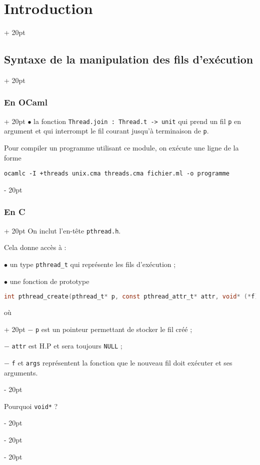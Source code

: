 \documentclass[a4paper, 12pt, twoside]{article}
\newcommand{\ind}[1][20pt]{\advance\leftskip + #1}
\newcommand{\deind}[1][20pt]{\advance\leftskip - #1}
\newenvironment{indt}[2][20pt]{#2 \par \ind[#1]}{\par \deind} %
\begin{document}
\begin{indt}{\section{Introduction}}
\begin{indt}{\subsection{Syntaxe de la manipulation des fils d'exécution}}
\begin{indt}{\subsubsection{En OCaml}}
                $\bullet$ la fonction \texttt{Thread.join : Thread.t -> unit} qui prend un fil \texttt p en argument et qui interrompt le fil courant jusqu'à terminaison de \texttt p.

                \vspace{12pt}
                
                Pour compiler un programme utilisant ce module, on exécute une ligne de la forme
                \begin{center}
                    \texttt{ocamlc -I +threads unix.cma threads.cma fichier.ml -o programme}
                \end{center}
            \end{indt}

            \vspace{12pt}
            
            \begin{indt}{\subsubsection{En C}}
                On inclut l'en-tête \texttt{pthread.h}.

                Cela donne accès à :

                $\bullet$  un type \texttt{pthread\_t} qui représente les fils d'exécution ;

                $\bullet$ une fonction de prototype

                \begin{lstlisting}[language=C, xleftmargin=80pt]
int pthread_create(pthread_t* p, const pthread_attr_t* attr, void* (*f)(void*), void* args)\end{lstlisting}

                \begin{indt}{où}
                    $-$ \texttt p est un pointeur permettant de stocker le fil créé ;

                    $-$ \texttt{attr} est H.P et sera toujours \texttt{NULL} ;

                    $-$ \texttt f et \texttt{args} représentent la fonction que le nouveau fil doit exécuter et ses arguments.
                \end{indt}

                \vspace{12pt}
                
                Pourquoi \texttt{void*} ?


\end{indt}
\end{indt}
\end{indt}
\end{document}
